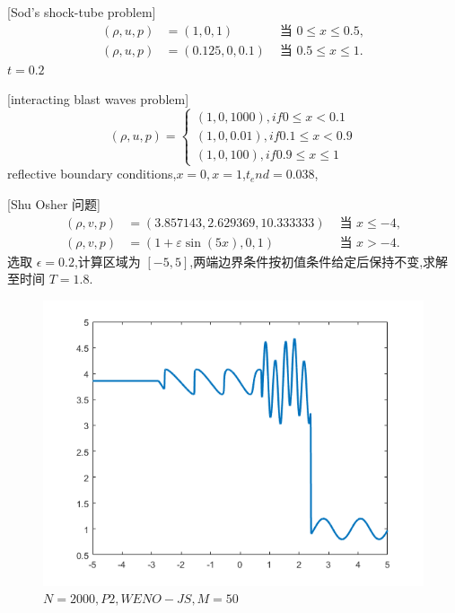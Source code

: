 \documentclass{book}
\begin{document}
\begin{example}{}{}
    
    [Sod's shock-tube problem\cite{RN204}]
    \begin{equation}
        \begin{aligned}
            (\rho, u, p) & =(1,0,1)       & \text { 当 }0\leqslant x \leq 0.5,      \\
            (\rho, u, p) & =(0.125,0,0.1) & \text { 当 }0.5\leqslant x\leqslant 1 .
        \end{aligned}
    \end{equation}
    $t=0.2$
\end{example}
\begin{example}{}{}
    
    [interacting blast waves problem\cite{RN204}]
    \begin{equation}
        (\rho,u,p)=
        \begin{cases}
            (1,0,1000), if 0\leqslant x<0.1      \\
            (1,0,0.01), if 0.1 \leqslant x < 0.9 \\
            (1,0,100),if 0.9\leqslant x \leqslant 1
        \end{cases}
    \end{equation}
    reflective boundary conditions,$x=0,x=1$,$t_end=0.038$,
\end{example}
\begin{example}{}{}
    
    [Shu Osher 问题\cite{RN109}]
    \begin{equation}
        \begin{aligned}
            (\rho, v, p) & =(3.857143,2.629369,10.333333)   & \text { 当 } x \leq-4, \\
            (\rho, v, p) & =(1+\varepsilon \sin (5 x), 0,1) & \text { 当 } x>-4 .
        \end{aligned}
    \end{equation}
    选取 $\epsilon = 0.2$,计算区域为 $[-5,5]$,两端边界条件按初值条件给定后保持不变,求解至时间 $T=1.8$.
    \begin{figure}[htp]
        \centering
        \label{fig:shu_Osher}
        \includegraphics[width=0.7\linewidth]{fig/Shu_Osher.png}
        \caption{$N=2000,P2,WENO-JS,M=50$}
    \end{figure}

\end{example}
\end{document}
